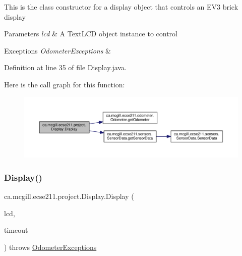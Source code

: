 This is the class constructor for a display object that controls an E\+V3 brick display


\begin{DoxyParams}{Parameters}
{\em lcd} & A Text\+L\+CD object instance to control \\
\hline
\end{DoxyParams}

\begin{DoxyExceptions}{Exceptions}
{\em Odometer\+Exceptions} & \\
\hline
\end{DoxyExceptions}


Definition at line 35 of file Display.\+java.

Here is the call graph for this function\+:
\nopagebreak
\begin{figure}[H]
\begin{center}
\leavevmode
\includegraphics[width=350pt]{classca_1_1mcgill_1_1ecse211_1_1project_1_1_display_af0970123ca090749bfb2f5b9f478c01d_cgraph}
\end{center}
\end{figure}
\mbox{\label{classca_1_1mcgill_1_1ecse211_1_1project_1_1_display_a690cd91bcc8024950c2b8e3b2613c801}} 
\subsubsection{\texorpdfstring{Display()}{Display()}\hspace{0.1cm}{\footnotesize\ttfamily [2/2]}}
{\footnotesize\ttfamily ca.\+mcgill.\+ecse211.\+project.\+Display.\+Display (\begin{DoxyParamCaption}\item[{Text\+L\+CD}]{lcd,  }\item[{long}]{timeout }\end{DoxyParamCaption}) throws \hyperlink{classca_1_1mcgill_1_1ecse211_1_1odometer_1_1_odometer_exceptions}{Odometer\+Exceptions}}

